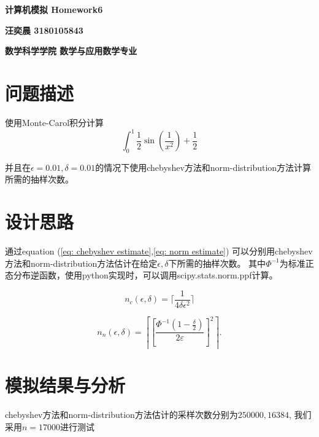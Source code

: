 \documentclass[12pt]{article}
\begin{document}
\pagestyle{fancy}
\setcounter{page}{1}
\vspace{20pt}
\centerline{{\Large \textbf{计算机模拟 Homework6}}}
\vspace{15pt}

\centerline{{\large \textbf{汪奕晨 3180105843}}}
\vspace{15pt}

\centerline{{\large \textbf{数学科学学院 数学与应用数学专业}}}
\vspace{15pt}

\section{问题描述}
使用Monte-Carol积分计算
$$
    \int_0^1\frac{1}{2}\sin(\frac{1}{x^2}) + \frac{1}{2}
$$

并且在$\epsilon = 0.01, \delta = 0.01$的情况下使用chebyshev方法和norm-distribution方法计算所需的抽样次数。
\section{设计思路}
通过equation (\ref{eq: chebyshev estimate},\ref{eq: norm estimate}) 可以分别用chebyshev方法和norm-distribution方法估计在给定$\epsilon, \delta$下所需的抽样次数。
其中$\Phi^{-1}$为标准正态分布逆函数，使用python实现时，可以调用scipy.stats.norm.ppf计算。

\begin{equation}
    n_c(\epsilon, \delta) = \lceil \frac{1}{4\delta\epsilon^2} \rceil
    \label{eq: chebyshev estimate}
\end{equation}

\begin{equation}
    n_n(\epsilon, \delta) =    \left\lceil \left[\frac{\Phi^{-1}(1 -\frac{\delta}{2})}{2\varepsilon}\right]^2\right\rceil.
    \label{eq: norm estimate}
\end{equation}


\section{模拟结果与分析}

chebyshev方法和norm-distribution方法估计的采样次数分别为$250000, 16384$, 我们采用$n=17000$进行测试
\end{document}
